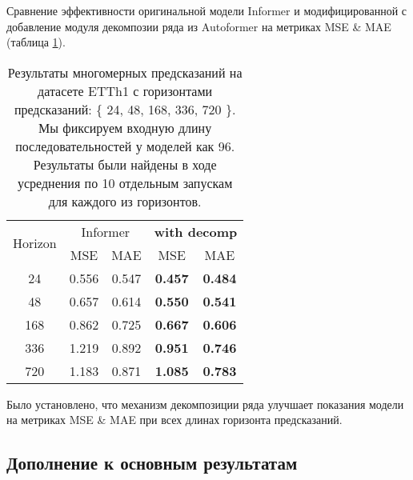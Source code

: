 Сравнение эффективности оригинальной модели Informer и модифицированной
с добавление модуля декомпозии ряда из Autoformer 
на метриках MSE \& MAE (таблица \ref{tab:etth1-decomp}).

\begin{table}[!ht]
    \centering
    \begin{tabular}{c  cc  cc}
    \toprule
    \multirow{2}{*}{{Horizon}} 
      & \multicolumn{2}{c}{{Informer}} 
      & \multicolumn{2}{c}{\textbf{with decomp}} \\
    \cmidrule(lr){2-3} \cmidrule(lr){4-5}
      & {MSE} & {MAE} 
      & {MSE} & {MAE} \\
    \midrule
    24   & 0.556 & 0.547 & \textbf{0.457} & \textbf{0.484} \\
    48   & 0.657 & 0.614 & \textbf{0.550} & \textbf{0.541} \\
    168  & 0.862 & 0.725 & \textbf{0.667} & \textbf{0.606} \\
    336  & 1.219 & 0.892 & \textbf{0.951} & \textbf{0.746} \\
    720  & 1.183 & 0.871 & \textbf{1.085} & \textbf{0.783} \\
    \bottomrule
    \end{tabular}
    \caption{Результаты многомерных предсказаний на датасете ETTh1 с 
    горизонтами предсказаний: \{ 24, 48, 168, 336, 720 \}. 
    Мы фиксируем входную длину последовательностей у моделей как 96.
    Результаты были найдены в ходе усреднения по 10 отдельным запускам 
    для каждого из горизонтов.}
    \label{tab:etth1-decomp}
\end{table}

Было установлено, что механизм декомпозиции ряда улучшает показания 
модели на метриках MSE \& MAE при всех длинах горизонта предсказаний.



\subsection{Дополнение к основным результатам}

